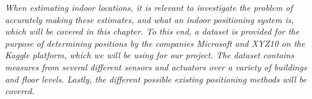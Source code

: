 
\textit{When estimating indoor locations, it is relevant to investigate the problem of accurately making these estimates, and what an indoor positioning system is, which will be covered in this chapter. To this end, a dataset is provided for the purpose of determining positions by the companies Microsoft and XYZ10 on the Kaggle platform, which we will be using for our project. The dataset contains measures from several different sensors and actuators over a variety of buildings and floor levels. Lastly, the different possible existing positioning methods will be covered.}